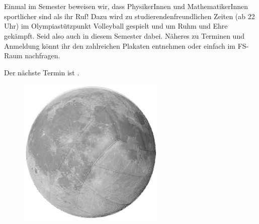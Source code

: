 \newpage\Large{}\normalfont\small\\ \quad \\

Einmal
im Semester beweisen wir, dass PhysikerInnen und MathematikerInnen sportlicher sind als ihr Ruf! Dazu wird zu studierendenfreundlichen Zeiten (ab 22 Uhr) im Olympiastützpunkt Volleyball gespielt und um Ruhm und Ehre gekämpft.
Seid also auch in diesem Semester dabei. Näheres zu Terminen und Anmeldung könnt ihr den zahlreichen Plakaten entnehmen oder einfach im FS-Raum nachfragen.

Der nächste Termin ist \volley.

\iftrue
\vfill

\begin{figure}[h]
    \centering
    \includegraphics[width=7cm]{bilder/volley_ballmond.jpg}
\end{figure}

\vfill
\fi
